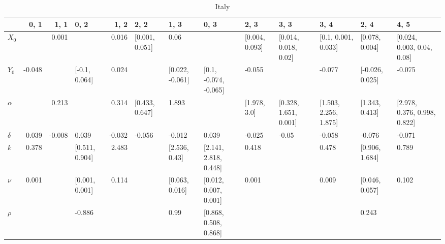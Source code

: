 \begin{table}[H]
\begin{adjustbox}{width=\textwidth}
	\end{adjustbox}
	
\end{table}

\begin{table}[H]
	\centering
	\caption{Italy}
	\label{italy_table}
	
	\begin{adjustbox}{width=\textwidth}
		
		\begin{tabular}{lrrlrllllllll}
			\toprule
			{} &   0, 1 &   1, 1 &            0, 2 &   1, 2 &            2, 2 &             1, 3 &                   0, 3 &            2, 3 &                   3, 3 &                   3, 4 &             2, 4 &                          4, 5 \\
			\midrule
			$X_0$   &        &  0.001 &                 &  0.016 &  [0.001, 0.051] &             0.06 &                        &  [0.004, 0.093] &   [0.014, 0.018, 0.02] &    [0.1, 0.001, 0.033] &   [0.078, 0.004] &    [0.024, 0.003, 0.04, 0.08] \\
			$Y_0$   & -0.048 &        &   [-0.1, 0.064] &  0.024 &                 &  [0.022, -0.061] &  [0.1, -0.074, -0.065] &          -0.055 &                        &                 -0.077 &  [-0.026, 0.025] &                        -0.075 \\
			$\alpha$ &        &  0.213 &                 &  0.314 &  [0.433, 0.647] &            1.893 &                        &    [1.978, 3.0] &  [0.328, 1.651, 0.001] &  [1.503, 2.256, 1.875] &   [1.343, 0.413] &  [2.978, 0.376, 0.998, 0.822] \\
			$\delta$ &  0.039 & -0.008 &           0.039 & -0.032 &          -0.056 &           -0.012 &                  0.039 &          -0.025 &                  -0.05 &                 -0.058 &           -0.076 &                        -0.071 \\
			$k$     &  0.378 &        &  [0.511, 0.904] &  2.483 &                 &    [2.536, 0.43] &  [2.141, 2.818, 0.448] &           0.418 &                        &                  0.478 &   [0.906, 1.684] &                         0.789 \\
			$\nu$    &  0.001 &        &  [0.001, 0.001] &  0.114 &                 &   [0.063, 0.016] &  [0.012, 0.007, 0.001] &           0.001 &                        &                  0.009 &   [0.046, 0.057] &                         0.102 \\
			$\rho$   &        &        &          -0.886 &        &                 &             0.99 &  [0.868, 0.508, 0.868] &                 &                        &                        &            0.243 &                               \\

\end{tabular}
\end{adjustbox}
\end{table}
